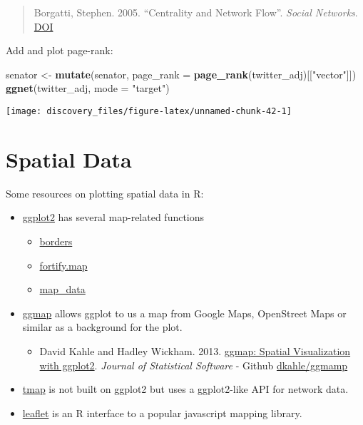 \documentclass[]{book}
\newenvironment{Shaded}{\begin{snugshade}}{\end{snugshade}}
\newcommand{\KeywordTok}[1]{\textcolor[rgb]{0.13,0.29,0.53}{\textbf{#1}}}
\newcommand{\DataTypeTok}[1]{\textcolor[rgb]{0.13,0.29,0.53}{#1}}
\newcommand{\StringTok}[1]{\textcolor[rgb]{0.31,0.60,0.02}{#1}}
\newcommand{\NormalTok}[1]{#1}
\providecommand{\tightlist}{%
  \setlength{\itemsep}{0pt}\setlength{\parskip}{0pt}}
\theoremstyle{definition}
\theoremstyle{definition}
\theoremstyle{definition}
\theoremstyle{remark}
\begin{document}
\begin{quote}
Borgatti, Stephen. 2005. ``Centrality and Network Flow''. \emph{Social
Networks}.
\href{https://dx.doi.org/doi:10.1016/j.socnet.2004.11.008}{DOI}
\end{quote}

Add and plot page-rank:

\begin{Shaded}
\begin{Highlighting}[]
\NormalTok{senator <-}\StringTok{ }\KeywordTok{mutate}\NormalTok{(senator, }\DataTypeTok{page_rank =} \KeywordTok{page_rank}\NormalTok{(twitter_adj)[[}\StringTok{"vector"}\NormalTok{]])}
\KeywordTok{ggnet}\NormalTok{(twitter_adj, }\DataTypeTok{mode =} \StringTok{"target"}\NormalTok{)}
\end{Highlighting}
\end{Shaded}

\begin{center}\texttt{[image: discovery\_files/figure-latex/unnamed-chunk-42-1]} \end{center}

\section{Spatial Data}\label{spatial-data}

Some resources on plotting spatial data in R:

\begin{itemize}
\item
  \href{https://cran.r-project.org/package=ggplot2}{ggplot2} has several
  map-related functions

  \begin{itemize}
  \tightlist
  \item
    \href{http://docs.ggplot2.org/current/borders.html}{borders}
  \item
    \href{http://docs.ggplot2.org/current/fortify.map.html}{fortify.map}
  \item
    \href{http://docs.ggplot2.org/current/map_data.html}{map\_data}
  \end{itemize}
\item
  \href{https://cran.r-project.org/package=ggmap}{ggmap} allows ggplot
  to us a map from Google Maps, OpenStreet Maps or similar as a
  background for the plot.

  \begin{itemize}
  \tightlist
  \item
    David Kahle and Hadley Wickham. 2013.
    \href{https://journal.r-project.org/archive/2013-1/kahle-wickhm.pdf}{ggmap:
    Spatial Visualization with ggplot2}. \emph{Journal of Statistical
    Software} - Github
    \href{https://github.com/dkahle/ggmap}{dkahle/ggmamp}
  \end{itemize}
\item
  \href{https://cran.r-project.org/package=tmap}{tmap} is not built on
  ggplot2 but uses a ggplot2-like API for network data.
\item
  \href{https://cran.r-project.org/package=leaflet}{leaflet} is an R
  interface to a popular javascript mapping library.
\end{itemize}
\end{document}
